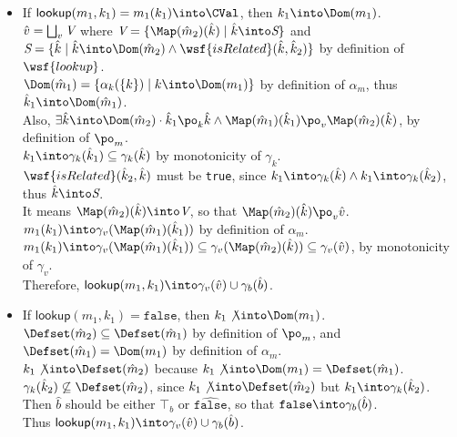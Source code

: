 \begin{itemize}
\item If $\textsf{lookup}(m_1, k_1) = m_1(k_1) \into \CVal$, then $k_1 \into \Dom(m_1)$.\\
$\hat{v} = \bigsqcup_v \emph{V}$
where $\emph{V} = \{ \Map(\hat{m}_2)(\hat{k}) \mid \hat{k} \into \emph{S} \}$
and $\emph{S} = \{ \hat{k} \mid \hat{k} \into \Dom(\hat{m}_2) \land \wsf{isRelated}(\hat{k}, \hat{k}_2) \}$
by definition of $\wsf{lookup}$. \vspace{1mm} \\
$\Dom(\hat{m}_1)  = \{ \alpha_k(\{k\}) \mid k \into \Dom(m_1) \}$
by definition of $\alpha_m$, thus $\hat{k}_1 \into \Dom(\hat{m}_1)$.\\
Also, $\exists \hat{k} \into \Dom(\hat{m}_2)
\cdot \hat{k}_1 \po_k \hat{k} \land \Map(\hat{m}_1)(\hat{k}_1) \po_v \Map(\hat{m}_2)(\hat{k})$,
by definition of $\po_m$.\\
$k_1 \into \gamma_k(\hat{k}_1) \subseteq \gamma_k(\hat{k})$ by monotonicity of $\gamma_k$.\\
$\wsf{isRelated}(\hat{k}_2, \hat{k})$ must be \texttt{true},
since $k_1 \into \gamma_k(\hat{k}) \land k_1 \into \gamma_k(\hat{k}_2)$,
thus $\hat{k} \into \emph{S} $.\\
It means $\Map(\hat{m}_2)(\hat{k}) \into \emph{V}$,
so that $\Map(\hat{m}_2)(\hat{k}) \po_v \hat{v}$. \vspace{1mm} \\
$m_1(k_1) \into \gamma_v (\Map(\hat{m}_1)(\hat{k}_1))$ by definition of $\alpha_m$.\\
$m_1(k_1) \into \gamma_v (\Map(\hat{m}_1)(\hat{k}_1))
\subseteq \gamma_v (\Map(\hat{m}_2)(\hat{k})) \subseteq \gamma_v (\hat{v})$,
by monotonicity of $\gamma_v$.\\
Therefore, $\textsf{lookup}(m_1, k_1) \into \gamma_v(\hat{v}) \cup \gamma_b(\hat{b})$.
\item If $\textsf{lookup}(m_1, k_1) = \texttt{false}$, then $k_1 \not\into \Dom(m_1)$.\\
$\Defset(\hat{m}_2) \subseteq \Defset(\hat{m}_1)$ by definition of $\po_m$,
and $\Defset(\hat{m}_1) = \Dom(m_1)$ by definition of $\alpha_m$.\\
$k_1 \not\into \Defset(\hat{m}_2)$ because $k_1 \not\into \Dom(m_1) = \Defset(\hat{m}_1)$. \\
$\gamma_k(\hat{k}_2) \not\subseteq \Defset(\hat{m}_2)$, since
$k_1 \not\into \Defset(\hat{m}_2)$ but $k_1 \into \gamma_k(\hat{k}_2)$.\\
Then $\hat{b}$ should be either $\top_b$ or $\hat{\texttt{false}}$,
so that $\texttt{false} \into \gamma_b(\hat{b})$. \\
Thus $\textsf{lookup}(m_1, k_1) \into \gamma_v(\hat{v}) \cup \gamma_b(\hat{b})$.
\end{itemize}



